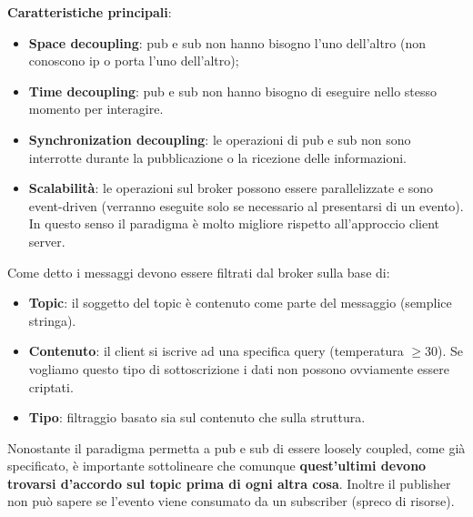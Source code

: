\documentclass[12pt]{article}
\begin{document}
    			\textbf{Caratteristiche principali}:
    			\begin{itemize}
    				\item \textbf{Space decoupling}: pub e sub non hanno bisogno l'uno dell'altro (non conoscono ip o porta l'uno dell'altro);
    				\item \textbf{Time decoupling}: pub e sub non hanno bisogno di eseguire nello stesso momento per interagire.
    				\item \textbf{Synchronization decoupling}: le operazioni di pub e sub non sono interrotte durante la pubblicazione o la ricezione delle informazioni.
    				\item \textbf{Scalabilità}: le operazioni sul broker possono essere parallelizzate e sono event-driven (verranno eseguite solo se necessario al presentarsi di un evento). In questo senso il paradigma è molto migliore rispetto all'approccio client server. 
    			\end{itemize}
    			Come detto i messaggi devono essere filtrati dal broker sulla base di:
    			\begin{itemize}
    				\item \textbf{Topic}: il soggetto del topic è contenuto come parte del messaggio (semplice stringa).
    				\item \textbf{Contenuto}: il client si iscrive ad una specifica query (temperatura $\geq 30$). Se vogliamo questo tipo di sottoscrizione i dati non possono ovviamente essere criptati.
    				\item \textbf{Tipo}: filtraggio basato sia sul contenuto che sulla struttura.
    			\end{itemize}
    			Nonostante il paradigma permetta a pub e sub di essere loosely coupled, come già specificato, è importante sottolineare che comunque \textbf{quest'ultimi devono trovarsi d'accordo sul topic prima di ogni altra cosa}. Inoltre il publisher non può sapere se l'evento viene consumato da un subscriber (spreco di risorse).
\end{document}

